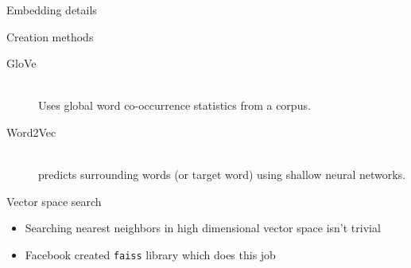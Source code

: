 \documentclass[aspectratio=169]{beamer}
\begin{document}
\begin{frame}{Embedding details}
  \begin{block}{Creation methods}
  \begin{description}
    \item[GloVe]\hfill \\ Uses global word co-occurrence statistics from a corpus.
    \item[Word2Vec]\hfill \\predicts surrounding words (or target word) using shallow neural networks.
  \end{description}
  \end{block}
  \begin{block}{Vector space search}
  \begin{itemize}
    \item Searching nearest neighbors in high dimensional vector space isn't  trivial
    \item Facebook created \texttt{faiss} library which does this job
  \end{itemize}
  \end{block}
\end{frame}
\end{document}

